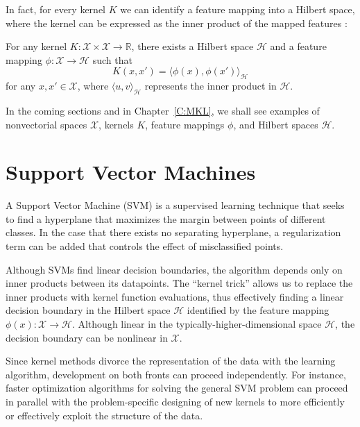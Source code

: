 In fact, for every kernel $K$ we can identify a feature mapping into a Hilbert
space, where the kernel can be expressed as the inner product of the mapped
features \cite{scholkopf2004kernel}:
\begin{theorem}
  For any kernel $K: \mathcal{X} \times \mathcal{X} \to \mathbb{R}$, there
  exists a Hilbert space $\mathcal{H}$ and a feature mapping
  $\phi: \mathcal{X} \to \mathcal{H}$ such that
  \begin{equation*}
    K(x, x') = \langle \phi(x), \phi(x') \rangle_{\mathcal{H}}
  \end{equation*}
  for any $x, x' \in \mathcal{X}$, where $\langle u, v \rangle_{\mathcal{H}}$
  represents the inner product in $\mathcal{H}$.
\end{theorem}

In the coming sections and in Chapter~\ref{C:MKL}, we shall see examples of
nonvectorial spaces $\mathcal{X}$, kernels $K$, feature mappings $\phi$, and
Hilbert spaces $\mathcal{H}$.

\section{Support Vector Machines}
A Support Vector Machine (SVM) \cite{cortes1995support} is a supervised learning
technique that seeks to find a hyperplane that maximizes the margin between
points of different classes.  In the case that there exists no separating
hyperplane, a regularization term can be added that controls the effect of
misclassified points.

Although SVMs find linear decision boundaries,
the algorithm depends only on inner products between its datapoints.  The
``kernel trick'' \cite{aizerman1964theoretical} allows us to replace the
inner products with kernel function evaluations, thus effectively finding
a linear decision boundary in the Hilbert space $\mathcal{H}$ identified by
the feature mapping $\phi(x): \mathcal{X} \to \mathcal{H}$.  Although linear
in the typically-higher-dimensional space $\mathcal{H}$, the decision boundary
can be nonlinear in $\mathcal{X}$.

Since kernel methods divorce the representation of the data with the learning
algorithm, development on both fronts can proceed independently.  For instance,
faster optimization algorithms for solving the general SVM problem can proceed
in parallel with the problem-specific designing of new kernels to more efficiently
or effectively exploit the structure of the data.

